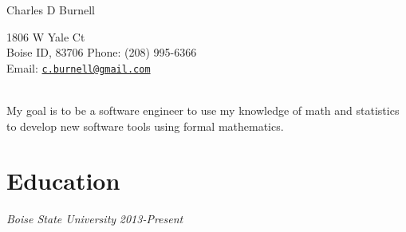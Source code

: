 \documentclass[letterpaper]{article}
\def\name{Charles D Burnell}
\def\goal{My goal is to be a software engineer to use my knowledge of math and statistics to develop new software tools using formal mathematics.}
\begin{document}
{\huge \name}
\vspace{.05in}\hline{}\vspace{.05in}
\vspace{.05in}\vspace{.05in}
\begin{multicols}{2}
1806 W Yale Ct \\
Boise ID, 83706
\vfill
\columnbreak
Phone: (208) 995-6366\\
Email:  \href{mailto:c.burnell@gmail.com}{\tt c.burnell@gmail.com}
\end{multicols}

\vspace{.05in}\\
\goal
\section*{Education}
\begin{multicols}{2}
\textit{Boise State University}
\vfill
\columnbreak
\textit{2013-Present}
\end{multicols}

\end{document}

